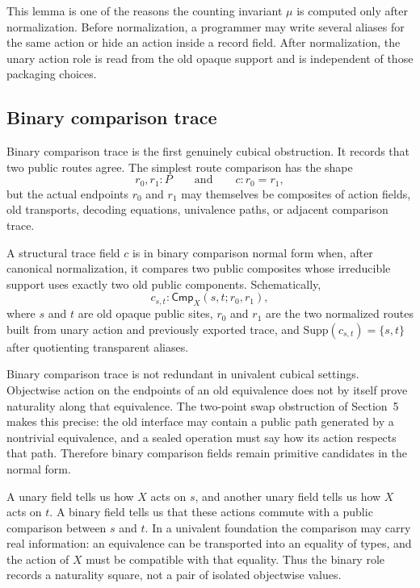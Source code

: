 This lemma is one of the reasons the counting invariant \(\mu\) is computed only after
normalization.  Before normalization, a programmer may write several aliases for the same
action or hide an action inside a record field.  After normalization, the unary action role is
read from the old opaque support and is independent of those packaging choices.

\subsection{Binary comparison trace}

Binary comparison trace is the first genuinely cubical obstruction.  It records that two
public routes agree.  The simplest route comparison has the shape
\[
  r_0,r_1 : P
  \qquad\text{and}\qquad
  c : r_0 = r_1,
\]
but the actual endpoints \(r_0\) and \(r_1\) may themselves be composites of action fields,
old transports, decoding equations, univalence paths, or adjacent comparison trace.

\begin{definition}
A structural trace field \(c\) is in binary comparison normal form when, after canonical
normalization, it compares two public composites whose irreducible support uses exactly two
old public components.  Schematically,
\[
  c_{s,t} : \mathsf{Cmp}_X(s,t;r_0,r_1),
\]
where \(s\) and \(t\) are old opaque public sites, \(r_0\) and \(r_1\) are the two normalized
routes built from unary action and previously exported trace, and
\(\mathrm{Supp}(c_{s,t})=\{s,t\}\) after quotienting transparent aliases.
\end{definition}

Binary comparison trace is not redundant in univalent cubical settings.  Objectwise action
on the endpoints of an old equivalence does not by itself prove naturality along that
equivalence.  The two-point swap obstruction of Section~5 makes this precise: the old
interface may contain a public path generated by a nontrivial equivalence, and a sealed
operation must say how its action respects that path.  Therefore binary comparison fields
remain primitive candidates in the normal form.

\begin{remark}
A unary field tells us how \(X\) acts on \(s\), and another unary field tells us how \(X\) acts
on \(t\).  A binary field tells us that these actions commute with a public comparison between
\(s\) and \(t\).  In a univalent foundation the comparison may carry real information: an
equivalence can be transported into an equality of types, and the action of \(X\) must be
compatible with that equality.  Thus the binary role records a naturality square, not a pair
of isolated objectwise values.
\end{remark}

